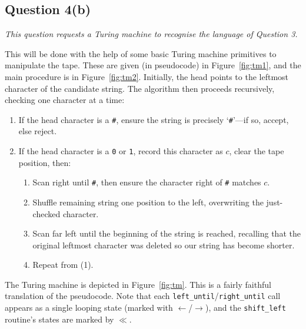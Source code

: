 \documentclass[a4paper]{article}
\begin{document}
\subsection*{Question 4(b)}
\begin{center}
  \textit{
    This question requests a Turing machine to recognise the language of Question 3.
  }
\end{center}
This will be done with the help of some basic Turing machine primitives to manipulate the tape. These are given (in pseudocode)
in Figure~\ref{fig:tm1}, and the main procedure is in Figure~\ref{fig:tm2}.
Initially, the head points to the leftmost character of the candidate string.
The algorithm then proceeds recursively, checking one character at a time:
\begin{enumerate}[label=(\arabic*),noitemsep]
  \item If the head character is a \texttt{\#}, ensure the string is precisely `\texttt{\#}'---if so, accept, else reject.
  \item If the head character is a \texttt{0} or \texttt 1, record this character as $c$, clear the tape position, then:
    \begin{enumerate}[noitemsep]
      \item Scan right until \texttt{\#}, then ensure the character right of \texttt{\#} matches $c$.
      \item Shuffle remaining string one position to the left,
        overwriting the just-checked character.
      \item Scan far left until the beginning of the string is reached,
        recalling that the original leftmost character was deleted
        so our string has become shorter.
      \item Repeat from (1).
    \end{enumerate}
\end{enumerate}
The Turing machine is depicted in Figure~\ref{fig:tm}.
This is a fairly faithful translation of the pseudocode.
Note that each \texttt{left\_until}/\texttt{right\_until} call appears as a single looping state (marked with $\leftarrow$/$\rightarrow$),
and the \texttt{shift\_left} routine's states are marked by $\ll$.
\end{document}
